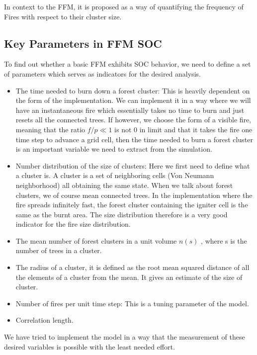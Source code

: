 \documentclass[11pt]{article}
\begin{document}
In context to the FFM, it is proposed as a way of quantifying the frequency of Fires with respect to their cluster size. 

\subsection{Key Parameters in FFM SOC}

To find out whether a basic FFM exhibits SOC behavior, we need to define a set of parameters which serves as indicators for the desired analysis. 
\begin{itemize}

\item The time needed to burn down a forest cluster: This is heavily dependent on the form of the implementation. We can implement it in a way where we will have an instantaneous fire which essentially takes no time to burn and just resets all the connected trees. If however, we choose the form of a visible fire, meaning that the ratio $f/p\ll1$  is not 0  in limit and that it takes the fire one time step to advance a grid cell, then the time needed to burn a forest cluster is an important variable we need to extract from the simulation.


\item Number distribution of the size of clusters: Here we first need to define what a cluster is. A cluster is a set of neighboring cells (Von Neumann neighborhood) all obtaining the same state. When we talk about forest clusters, we of course mean connected trees. In the implementation where the fire spreads infinitely fast, the forest cluster containing the igniter cell is the same as the burnt area. The size distribution therefore is a very good indicator for the fire size distribution. 

\item The mean number of forest clusters in a unit volume $n(s)$ , where s  is the number of trees in a cluster. 

\item The radius of a cluster, it is defined as the root mean squared distance of all the elements of a cluster from the mean. It gives an estimate of the size of cluster. 

\item Number of fires per unit time step: This is a tuning parameter of the model.

\item Correlation length.
\end{itemize}
We have tried to implement the model in a way that the measurement of these desired variables is possible with the least needed effort.
\end{document}
